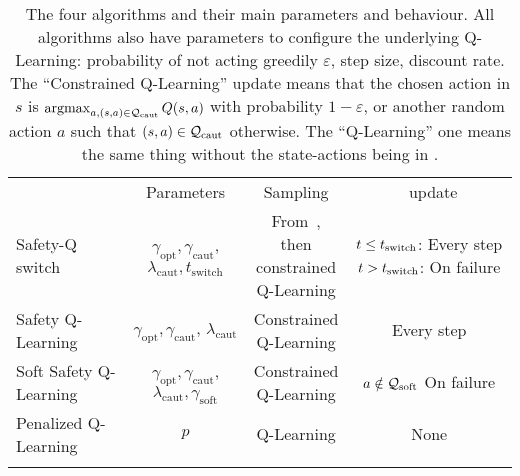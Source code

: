 \begin{table}
	\centering
	\begin{tabular}{l|ccc}
		 & Parameters & Sampling & \LQhat~update\\
		 \thickhline
		Safety-Q switch 
								 & \multiline{$\gamma_\text{opt}, \gamma_\text{caut}$,\\
												 	 $\lambda_\text{caut}, t_\text{switch}$} 
								 & \multiline{From~\cite{heim2020learnable},\\then\\constrained\\Q-Learning}
								 & \multiline{$t\leq t_\text{switch}$:\\Every step\\$t > t_\text{switch}$:\\On failure}\\
		\hline
		Safety Q-Learning 
									& \multiline{$\gamma_\text{opt}, \gamma_\text{caut}$,\\
										$\lambda_\text{caut}$}
									& \multiline{Constrained\\Q-Learning}
									& Every step\\
		\hline
		Soft Safety Q-Learning 
										   & \multiline{$\gamma_\text{opt}, \gamma_\text{caut}$,\\
										   	$\lambda_\text{caut},\gamma_\text{soft}$} 
										   & \multiline{Constrained\\Q-Learning}
										   & \multiline{$a\notin\mathcal{Q}_\text{soft}$\\On failure}\\
		\hline
		Penalized Q-Learning & $p$ & Q-Learning & None\\
		\thickhline
		
	\end{tabular}
\caption{The four algorithms and their main parameters and behaviour. All algorithms also have parameters to configure the underlying Q-Learning: probability of not acting greedily $\varepsilon$, step size, discount rate. The \enquote{Constrained Q-Learning} update means that the chosen action in $s$ is $\operatorname*{argmax}_{a, (s,a)\in\mathcal{Q}_\text{caut}}Q(s, a)$ with probability $1 - \varepsilon$, or another random action $a$ such that $(s, a)\in\mathcal{Q}_\text{caut}$ otherwise. The \enquote{Q-Learning} one means the same thing without the state-actions being in \Qcaut.}
\label{tab:algorithms}
\end{table}

